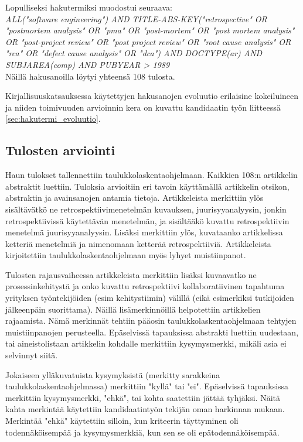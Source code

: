 Lopulliseksi hakutermiksi muodostui seuraava:\\
\textit{ALL("software engineering") AND TITLE-ABS-KEY("retrospective" OR "postmortem analysis" OR "pma" OR "post-mortem" OR "post mortem analysis" OR "post-project review" OR "post project review" OR "root cause analysis" OR "rca" OR "defect cause analysis" OR "dca") AND DOCTYPE(ar) AND SUBJAREA(comp) AND PUBYEAR > 1989}\\
Näillä hakusanoilla löytyi yhteensä 108 tulosta.

Kirjallisuuskatsauksessa käytettyjen hakusanojen evoluutio erilaisine kokeiluineen ja niiden toimivuuden arvioinnin kera on kuvattu kandidaatin työn liitteessä \ref{sec:hakutermi_evoluutio}.

\subsection{Tulosten arviointi}
Haun tulokset tallennettiin taulukkolaskentaohjelmaan. Kaikkien 108:n artikkelin abstraktit luettiin. Tuloksia arvioitiin eri tavoin käyttämällä artikkelin otsikon, abstraktin ja avainsanojen antamia tietoja. Artikkeleista merkittiin ylös sisältävätkö ne retrospektiivimenetelmän kuvauksen, juurisyyanalyysin, jonkin retrospektiivissä käytettävän menetelmän, ja sisältääkö kuvattu retrospektiivin menetelmä juurisyyanalyysin. Lisäksi merkittiin ylös, kuvataanko artikkelissa ketteriä menetelmiä ja nimenomaan ketterää retrospektiiviä. Artikkeleista kirjoitettiin taulukkolaskentaohjelmaan myös lyhyet muistiinpanot.

Tulosten rajausvaiheessa artikkeleista merkittiin lisäksi kuvaavatko ne prosessinkehitystä ja onko kuvattu retrospektiivi kollaboratiivinen tapahtuma yrityksen työntekijöiden (esim kehitystiimin) välillä (eikä esimerkiksi tutkijoiden jälkeenpäin suorittama). Näillä lisämerkinnöillä helpotettiin artikkelien rajaamista. Nämä merkinnät tehtiin pääosin taulukkolaskentaohjelmaan tehtyjen muistiinpanojen perusteella. Epäselvissä tapauksissa abstrakti luettiin uudestaan, tai  aineistolistaan artikkelin kohdalle merkittiin kysymysmerkki, mikäli asia ei selvinnyt siitä.

Jokaiseen ylläkuvatuista kysymyksistä (merkitty sarakkeina taulukkolaskentaohjelmassa) merkittiin "kyllä" tai "ei". Epäselvissä tapauksissa merkittiin kysymysmerkki, "ehkä", tai kohta saatettiin jättää tyhjäksi. Näitä kahta merkintää käytettiin kandidaatintyön tekijän oman harkinnan mukaan. Merkintää "ehkä" käytettiin silloin, kun kriteerin täyttyminen oli todennäköisempää ja kysymysmerkkiä, kun sen se oli epätodennäköisempää. 

